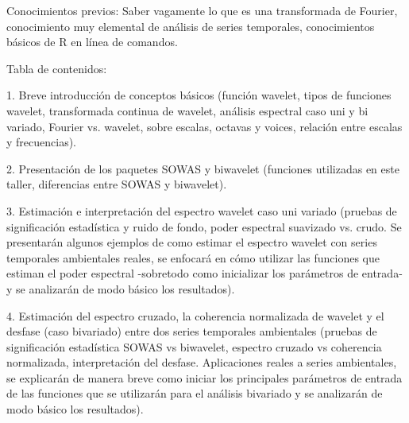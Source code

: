 Conocimientos previos: 
Saber vagamente lo que es una transformada de Fourier, conocimiento muy elemental de análisis  de series temporales, conocimientos básicos de R en línea de comandos. 


Tabla de contenidos: 

1. Breve introducción de conceptos básicos (función wavelet, tipos de funciones wavelet, transformada continua de wavelet, análisis espectral caso uni y bi variado, Fourier vs. wavelet, sobre escalas,  octavas y voices, relación entre escalas y frecuencias).  

2. Presentación de los paquetes SOWAS y biwavelet (funciones utilizadas en este taller, diferencias entre SOWAS y biwavelet). 

3. Estimación e interpretación del espectro wavelet caso uni variado (pruebas de significación estadística y ruido de fondo, poder espectral suavizado vs. crudo. Se presentarán algunos ejemplos de como estimar el espectro wavelet con series temporales ambientales reales, se enfocará en cómo utilizar las funciones que estiman el poder espectral -sobretodo como inicializar los parámetros de entrada-  y se analizarán de modo básico los resultados). 

4. Estimación del espectro cruzado, la coherencia normalizada de wavelet y el desfase (caso bivariado) entre dos series temporales ambientales (pruebas de significación estadística SOWAS vs biwavelet, espectro cruzado vs coherencia normalizada, interpretación del desfase. Aplicaciones reales a series ambientales, se explicarán de manera breve como iniciar los principales parámetros de entrada de las funciones que se utilizarán para el análisis bivariado y se analizarán de modo básico los resultados). 



%

%
